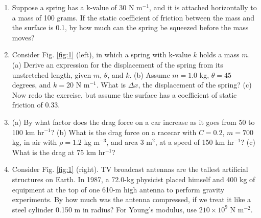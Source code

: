 \documentclass{article}
\begin{document}
\begin{enumerate}
\item Suppose a spring has a k-value of $30$ N m$^{-1}$, and it is attached horizontally to a mass of 100 grams.  If the static coefficient of friction between the mass and the surface is 0.1, by how much can the spring be squeezed before the mass moves? \\ \vspace{3cm}
\item Consider Fig. \ref{fig:1} (left), in which a spring with k-value $k$ holds a mass $m$.  (a) Derive an expression for the displacement of the spring from its unstretched length, given $m$, $\theta$, and $k$. (b) Assume $m = 1.0$ kg, $\theta = 45$ degrees, and $k = 20$ N m$^{-1}$.  What is $\Delta x$, the displacement of the spring? (c) Now redo the exercise, but assume the surface has a coefficient of static friction of 0.33.  \\ \vspace{4cm}
\item (a) By what factor does the drag force on a car increase as it goes from 50 to 100 km hr$^{-1}$? (b) What is the drag force on a racecar with $C=0.2$, $m=700$ kg, in air with $\rho = 1.2$ kg m$^{-3}$, and area 3 m$^2$, at a speed of 150 km hr$^{-1}$? (c) What is the drag at 75 km hr$^{-1}$? \\ \vspace{4cm}
\item Consider Fig. \ref{fig:1} (right). TV broadcast antennas are the tallest artificial structures on Earth. In 1987, a 72.0-kg physicist placed himself and 400 kg of equipment at the top of one 610-m high antenna to perform gravity experiments. By how much was the antenna compressed, if we treat it like a steel cylinder 0.150 m in radius? For Young's modulus, use $210 \times 10^9$ N m$^{-2}$.
\end{enumerate}
\end{document}
